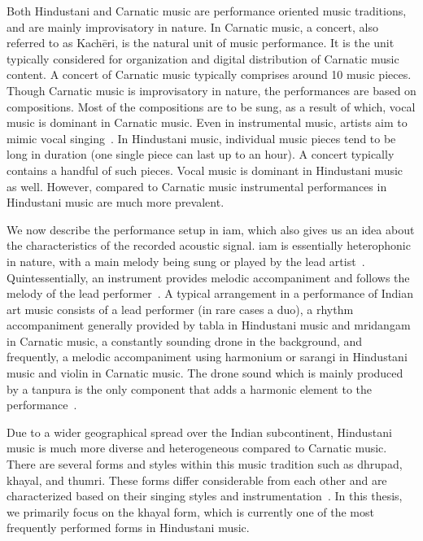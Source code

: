 Both Hindustani and Carnatic music are performance oriented music traditions, and are mainly improvisatory in nature. In Carnatic music, a concert, also referred to as Kach\={e}ri, is the natural unit of music performance. It is the unit typically considered for organization and digital distribution of Carnatic music content. A concert of Carnatic music typically comprises around 10 music pieces. Though Carnatic music is improvisatory in nature, the performances are based on compositions. Most of the compositions are to be sung, as a result of which, vocal music is dominant in Carnatic music. Even in instrumental music, artists aim to mimic vocal singing~\citep{Viswanathan2004}. In Hindustani music, individual music pieces tend to be long in duration (one single piece can last up to an hour). A concert typically contains a handful of such pieces. Vocal music is dominant in Hindustani music as well. However, compared to Carnatic music instrumental performances in Hindustani music are much more prevalent. 

We now describe the performance setup in \gls{iam}, which also gives us an idea about the characteristics of the recorded acoustic signal. \gls{iam} is essentially heterophonic in nature, with a main melody being sung or played by the lead artist~\citep{Bagchee1998}. Quintessentially, an instrument provides melodic accompaniment and follows the melody of the lead performer~\citep{Viswanathan2004}. A typical arrangement in a performance of Indian art music consists of a lead performer (in rare cases a duo), a rhythm accompaniment generally provided by \gls{tabla} in Hindustani music and \gls{mridangam} in Carnatic music, a constantly sounding drone in the background, and frequently, a melodic accompaniment using harmonium or \gls{sarangi} in Hindustani music and violin in Carnatic music. The drone sound which is mainly produced by a \gls{tanpura} is the only component that adds a harmonic element to the performance~\citep{Bagchee1998}. %

Due to a wider geographical spread over the Indian subcontinent, Hindustani music is much more diverse and heterogeneous compared to Carnatic music. There are several forms and styles within this music tradition such as \gls{dhrupad}, \gls{khayal}, and \gls{thumri}. These forms differ considerable from each other and are characterized based on their singing styles and instrumentation~\citep{Bor2010}. In this thesis, we primarily focus on the \gls{khayal} form, which is currently one of the most frequently performed forms in Hindustani music. 

